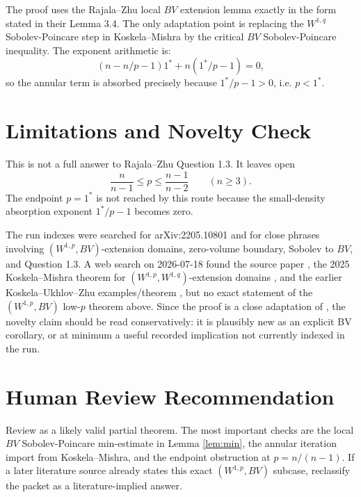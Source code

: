 \documentclass[11pt]{article}
\newcommand{\onecrit}{1^\ast}
\begin{document}
The proof uses the Rajala--Zhu local \(BV\) extension lemma exactly in the
form stated in their Lemma 3.4. The only adaptation point is replacing the
\(W^{1,q}\) Sobolev-Poincare step in Koskela--Mishra by the critical
\(BV\) Sobolev-Poincare inequality. The exponent arithmetic is:
\[
  (n-n/p-1)\onecrit+n(\onecrit/p-1)=0,
\]
so the annular term is absorbed precisely because \(\onecrit/p-1>0\), i.e.
\(p<\onecrit\).

\section*{Limitations and Novelty Check}

This is not a full answer to Rajala--Zhu Question 1.3. It leaves open
\[
  \frac{n}{n-1}\le p\le \frac{n-1}{n-2}
  \qquad (n\ge3).
\]
The endpoint \(p=\onecrit\) is not reached by this route because the
small-density absorption exponent \(\onecrit/p-1\) becomes zero.

The run indexes were searched for arXiv:2205.10801 and for close phrases
involving \((W^{1,p},BV)\)-extension domains, zero-volume boundary, Sobolev to
\(BV\), and Question 1.3. A web search on 2026-07-18 found the source paper
\cite{RZ}, the 2025 Koskela--Mishra theorem for \((W^{1,p},W^{1,q})\)-extension
domains \cite{KM}, and the earlier Koskela--Ukhlov--Zhu examples/theorem
\cite{KUZ}, but no exact statement of the \((W^{1,p},BV)\) low-\(p\) theorem
above. Since the proof is a close adaptation of \cite{KM}, the novelty claim
should be read conservatively: it is plausibly new as an explicit BV corollary,
or at minimum a useful recorded implication not currently indexed in the run.

\section*{Human Review Recommendation}

Review as a likely valid partial theorem. The most important checks are the
local \(BV\) Sobolev-Poincare min-estimate in Lemma \ref{lem:min}, the
annular iteration import from Koskela--Mishra, and the endpoint obstruction
at \(p=n/(n-1)\). If a later literature source already states this exact
\((W^{1,p},BV)\) subcase, reclassify the packet as a literature-implied answer.
\end{document}

